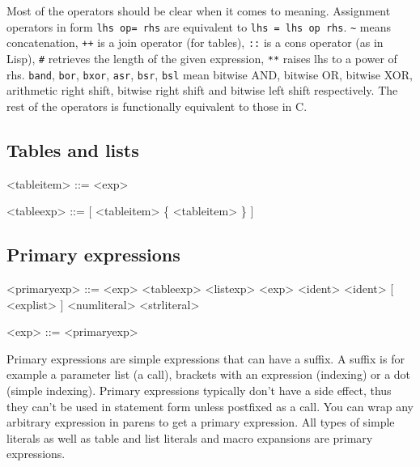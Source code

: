 \documentclass{article}
\newenvironment{bnf}
{
\begin{mdframed}
\begin{grammar}
}
{
\end{grammar}
\end{mdframed}
}
\begin{document}
Most of the operators should be clear when it comes to meaning. Assignment
operators in form \verb|lhs op= rhs| are equivalent to \verb|lhs = lhs op rhs|.
\verb|~| means concatenation, \verb|++| is a join operator (for tables),
\verb|::| is a cons operator (as in Lisp), \verb|#| retrieves the length
of the given expression, \verb|**| raises lhs to a power of rhs. \verb|band|,
\verb|bor|, \verb|bxor|, \verb|asr|, \verb|bsr|, \verb|bsl| mean bitwise AND,
bitwise OR, bitwise XOR, arithmetic right shift, bitwise right shift and
bitwise left shift respectively. The rest of the operators is functionally
equivalent to those in C.
\subsection{Tables and lists}
\begin{bnf}
<tableitem> ::= <exp>

<tableexp> ::= \lit{\{} [ <tableitem> \{ \lit{,} <tableitem> \} ] \lit{\}}
\end{bnf}

\subsection{Primary expressions}
\begin{bnf}
<primaryexp> ::= \lit{(} <exp> \lit{)}
    \alt <tableexp>
    \alt <listexp>
    \alt \lit{\$(} <exp> \lit{)}
    \alt \lit{\$} <ident>
    \alt <ident> [ \lit{!} \lit{(} <explist> \lit{)} ]
    \alt <numliteral>
    \alt <strliteral>
    \alt {}
    \alt {}
    \alt {}

<exp> ::= <primaryexp>
\end{bnf}
Primary expressions are simple expressions that can have a suffix. A suffix
is for example a parameter list (a call), brackets with an expression
(indexing) or a dot (simple indexing). Primary expressions typically don't
have a side effect, thus they can't be used in statement form unless postfixed
as a call. You can wrap any arbitrary expression in parens to get a primary
expression. All types of simple literals as well as table and list literals
and macro expansions are primary expressions.
\end{document}
